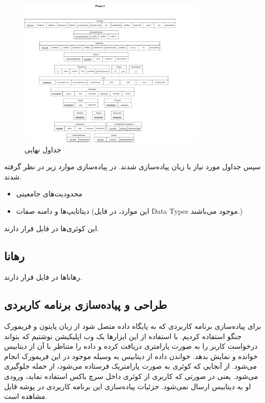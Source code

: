 \documentclass{article}
\begin{document}
\begin{figure}[!htbp]
    \centering
    \includegraphics[width=0.8\textwidth]{../DB Project-Phase 2.png}
    \caption{جداول نهایی}
    \label{fig:tables}
\end{figure}

سپس جداول مورد نیاز با زبان
پیاده‌سازی شدند. در پیاده‌سازی موارد زیر در نظر گرفته شدند. 

\begin{itemize}
    \item محدودیت‌های جامعیتی
    \item دیتاتایپ‌ها و دامنه صفات (این موارد، در فایل Data Types موجود می‌باشند.)
\end{itemize}


این کوئری‌ها در فایل 
قرار دارند.

\subsection{رهانا}
رهاناها در فایل 
قرار دارند.


\subsection{طراحی و پیاده‌سازی برنامه کاربردی}
برای پیاده‌سازی برنامه کاربردی که به پایگاه داده متصل شود از زبان پایتون و فریمورک جنگو استفاده کردیم. 
با استفاده از این ابزارها یک وب اپلیکیشن نوشتیم که بتواند درخواست کاربر را به صورت پارامتری دریافت کرده 
و داده را متناظر با آن از دیتابیس 
خوانده و نمایش بدهد. خواندن داده از دیتابیس به وسیله 
موجود در این فریمورک انجام می‌شود. از آنجایی که کوئری به صورت پارامتریک فرستاده می‌شود، 
از حمله 
جلوگیری می‌شود. یعنی در صورتی که کاربری از کوئری 
داخل سرچ باکس استفاده نماید، ورودی او به دیتابیس ارسال نمی‌شود. جزئیات پیاده‌سازی این برنامه کاربردی در 
پوشه 
قابل مشاهده است. 
\end{document}

